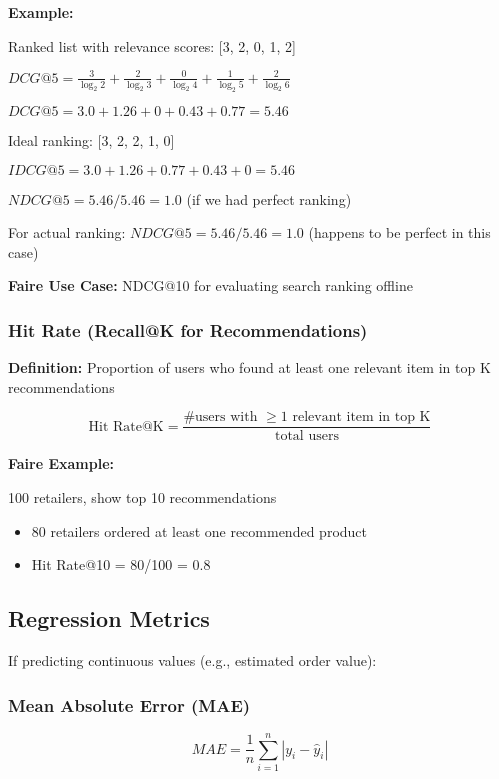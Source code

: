 \documentclass[11pt,letterpaper]{article}
\begin{document}
\textbf{Example:}

Ranked list with relevance scores: [3, 2, 0, 1, 2]

$DCG@5 = \frac{3}{\log_2 2} + \frac{2}{\log_2 3} + \frac{0}{\log_2 4} + \frac{1}{\log_2 5} + \frac{2}{\log_2 6}$

$DCG@5 = 3.0 + 1.26 + 0 + 0.43 + 0.77 = 5.46$

Ideal ranking: [3, 2, 2, 1, 0]

$IDCG@5 = 3.0 + 1.26 + 0.77 + 0.43 + 0 = 5.46$

$NDCG@5 = 5.46 / 5.46 = 1.0$ (if we had perfect ranking)

For actual ranking: $NDCG@5 = 5.46 / 5.46 = 1.0$ (happens to be perfect in this case)

\textbf{Faire Use Case:} NDCG@10 for evaluating search ranking offline

\subsubsection{Hit Rate (Recall@K for Recommendations)}

\textbf{Definition:} Proportion of users who found at least one relevant item in top K recommendations

\begin{equation}
\text{Hit Rate@K} = \frac{\text{\# users with } \geq 1 \text{ relevant item in top K}}{\text{total users}}
\end{equation}

\textbf{Faire Example:}

100 retailers, show top 10 recommendations
\begin{itemize}
    \item 80 retailers ordered at least one recommended product
    \item Hit Rate@10 = 80/100 = 0.8
\end{itemize}

\subsection{Regression Metrics}

If predicting continuous values (e.g., estimated order value):

\subsubsection{Mean Absolute Error (MAE)}

\begin{equation}
MAE = \frac{1}{n} \sum_{i=1}^{n} |y_i - \hat{y}_i|
\end{equation}
\end{document}
